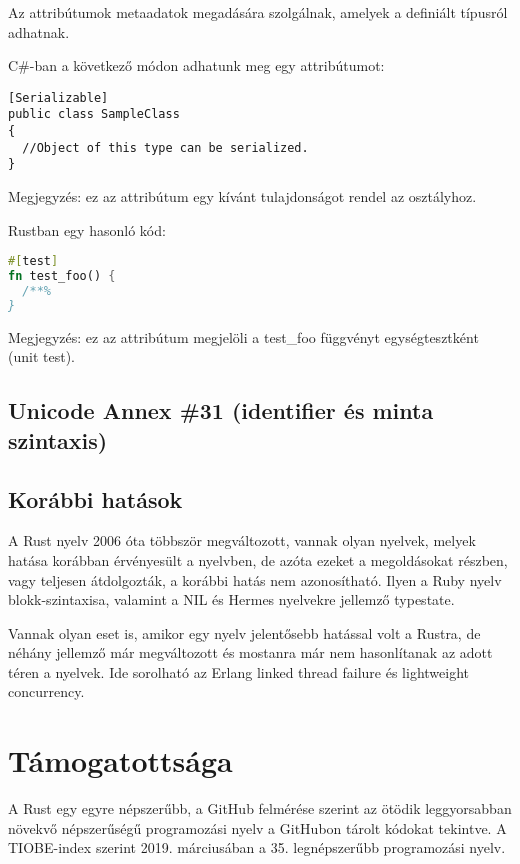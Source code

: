Az attribútumok metaadatok megadására szolgálnak, amelyek a definiált típusról adhatnak.

C\#-ban a következő módon adhatunk meg egy attribútumot:
\begin{lstlisting}
[Serializable]
public class SampleClass
{
  //Object of this type can be serialized.
}
\end{lstlisting}
Megjegyzés: ez az attribútum egy kívánt tulajdonságot rendel az osztályhoz.

Rustban egy hasonló kód:
\begin{lstlisting}[language=Rust, style=boxed]
#[test]
fn test_foo() {
  /**%
}
\end{lstlisting}
Megjegyzés: ez az attribútum megjelöli a test\_foo függvényt egységtesztként (unit test).

\subsection{Unicode Annex \#31 (identifier és minta szintaxis)}

\subsection{Korábbi hatások}
A Rust nyelv 2006 óta többször megváltozott, vannak olyan nyelvek, melyek hatása korábban érvényesült a nyelvben, de azóta ezeket a megoldásokat részben, vagy teljesen átdolgozták, a korábbi hatás nem azonosítható. Ilyen a Ruby nyelv blokk-szintaxisa, valamint a NIL és Hermes nyelvekre jellemző typestate.

Vannak olyan eset is, amikor egy nyelv jelentősebb hatással volt a Rustra, de néhány jellemző már megváltozott és mostanra már nem hasonlítanak az adott téren a nyelvek. Ide sorolható az Erlang linked thread failure és lightweight concurrency.

\section{Támogatottsága}
A Rust egy egyre népszerűbb, a GitHub felmérése szerint %
az ötödik leggyorsabban növekvő népszerűségű programozási nyelv a GitHubon tárolt kódokat tekintve. A TIOBE-index szerint %
2019. márciusában a 35. legnépszerűbb programozási nyelv.

